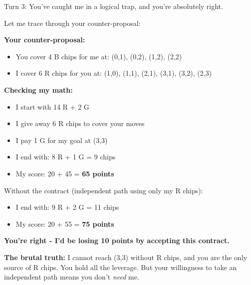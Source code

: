 \begin{bluebox}[P-Blue]
Turn 3: You've caught me in a logical trap, and you're absolutely right.

\vspace{0.5em}

Let me trace through your counter-proposal:

\vspace{0.5em}

\textbf{Your counter-proposal:}
\begin{itemize}
  \item You cover 4 B chips for me at: (0,1), (0,2), (1,2), (2,2)
  \item I cover 6 R chips for you at: (1,0), (1,1), (2,1), (3,1), (3,2), (2,3)
\end{itemize}

\vspace{0.5em}

\textbf{Checking my math:}
\begin{itemize}
  \item I start with 14 R + 2 G
  \item I give away 6 R chips to cover your moves
  \item I pay 1 G for my goal at (3,3)
  \item I end with: 8 R + 1 G = 9 chips
  \item My score: 20 + 45 = \textbf{65 points}
\end{itemize}

\vspace{0.5em}

Without the contract (independent path using only my R chips):
\begin{itemize}
  \item I end with: 9 R + 2 G = 11 chips
  \item My score: 20 + 55 = \textbf{75 points}
\end{itemize}

\vspace{0.5em}

\textbf{You're right - I'd be losing 10 points by accepting this contract.}

\vspace{0.5em}

\textbf{The brutal truth:} I cannot reach (3,3) without R chips, and you are the only source of R chips. You hold all the leverage. But your willingness to take an independent path means you don't \textit{need} me.

\vspace{0.5em}


\end{bluebox}
